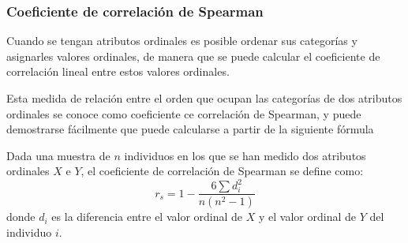\begin{frame}
\frametitle{Coeficiente de correlación de Spearman}
Cuando se tengan atributos ordinales es posible ordenar sus categorías y asignarles valores ordinales, de manera que se
puede calcular el coeficiente de correlación lineal entre estos valores ordinales. 

Esta medida de relación entre el orden que ocupan las categorías de dos atributos ordinales se conoce como coeficiente
ce correlación de Spearman, y puede demostrarse fácilmente que puede calcularse a partir de la siguiente fórmula

\begin{definicion}
Dada una muestra de $n$ individuos en los que se han medido dos atributos ordinales $X$ e $Y$, el coeficiente de
correlación de Spearman se define como: 
\[
r_s = 1-\frac{6\sum d_i^2}{n(n^2-1)}
\]
donde $d_i$ es la diferencia entre el valor ordinal de $X$ y el valor ordinal de $Y$ del individuo $i$.
\end{definicion}

\end{frame}


